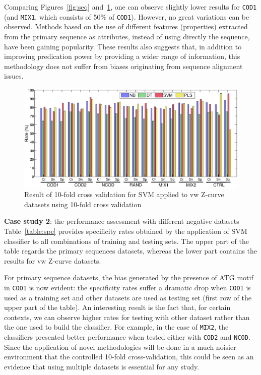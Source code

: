 \documentclass[conference]{IEEEtran}
\begin{document}
Comparing Figures~\ref{fig:seq} and~\ref{fig:zcurve}, one can observe slightly lower results for {\tt COD1} (and {\tt MIX1}, which consists of 50\% of {\tt COD1}). However, no great variations can be observed. Methods based on the use of different features (properties) extracted from the primary sequence as attributes, instead of using directly the sequence, have been gaining popularity. These results also suggests that, in addition to improving predication power by providing a wider range of information, this methodology does not suffer from biases originating from sequence alignment issues. \\

\begin{figure}[htp]
\centerline{\includegraphics[width=1.0\textwidth]{Figs/Fig2.eps}} 
\caption{Result of 10-fold cross validation for  SVM applied to vw Z-curve datasets using 10-fold cross validation}
\label{fig:zcurve}
\end{figure}

\noindent
{\bf Case study 2}: the performance assessment with different negative datasets \\

Table~\ref{table:spe} provides specificity rates obtained by the application of SVM classifier to all combinations of training and testing sets. The upper part of the table regards the primary sequences datasets, whereas the lower part contains the results for vw Z-curve datasets. 

For primary sequence datasets, the bias generated by the presence of ATG motif in {\tt COD1} is now evident: the specificity rates suffer a dramatic drop when {\tt COD1} is used as a training set and other datasets are used as testing set (first row of the upper part of the table). An interesting result is the fact that, for certain contexts, we can observe higher rates for testing with other dataset rather than the one used to build the classifier. For example, in the case of {\tt MIX2}, the classifiers presented better performance when tested either with {\tt COD2} and {\tt NCOD}. Since the application of novel methodologies will be done in a much noisier environment that the controlled 10-fold cross-validation, this could be seen as an evidence that using multiple datasets is essential for any study.
\end{document}
